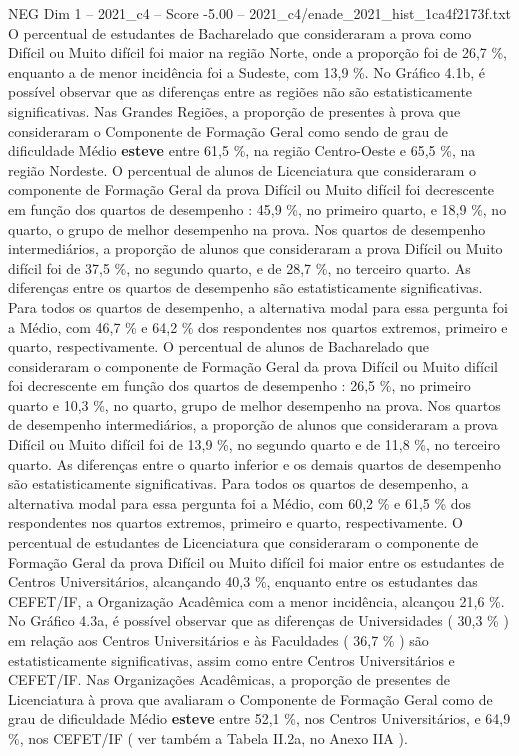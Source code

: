 \begin{textsample}{NEG Dim 1 – 2021\_c4 – Score -5.00 – 2021\_c4/enade\_2021\_hist\_1ca4f2173f.txt}
O percentual de estudantes de Bacharelado que consideraram a prova como Difícil ou Muito difícil foi maior na região Norte, onde a proporção foi de 26,7 \%, enquanto a de menor incidência foi a Sudeste, com 13,9 \%.
No Gráfico 4.1b, é possível observar que as diferenças entre as regiões não são estatisticamente significativas.
Nas Grandes Regiões, a proporção de presentes à prova que consideraram o Componente de Formação Geral como sendo de grau de dificuldade Médio \textbf{esteve} entre 61,5 \%, na região Centro-Oeste e 65,5 \%, na região Nordeste.
O percentual de alunos de Licenciatura que consideraram o componente de Formação Geral da prova Difícil ou Muito difícil foi decrescente em função dos quartos de desempenho : 45,9 \%, no primeiro quarto, e 18,9 \%, no quarto, o grupo de melhor desempenho na prova.
Nos quartos de desempenho intermediários, a proporção de alunos que consideraram a prova Difícil ou Muito difícil foi de 37,5 \%, no segundo quarto, e de 28,7 \%, no terceiro quarto.
As diferenças entre os quartos de desempenho são estatisticamente significativas.
Para todos os quartos de desempenho, a alternativa modal para essa pergunta foi a Médio, com 46,7 \% e 64,2 \% dos respondentes nos quartos extremos, primeiro e quarto, respectivamente.
O percentual de alunos de Bacharelado que consideraram o componente de Formação Geral da prova Difícil ou Muito difícil foi decrescente em função dos quartos de desempenho : 26,5 \%, no primeiro quarto e 10,3 \%, no quarto, grupo de melhor desempenho na prova.
Nos quartos de desempenho intermediários, a proporção de alunos que consideraram a prova Difícil ou Muito difícil foi de 13,9 \%, no segundo quarto e de 11,8 \%, no terceiro quarto.
As diferenças entre o quarto inferior e os demais quartos de desempenho são estatisticamente significativas.
Para todos os quartos de desempenho, a alternativa modal para essa pergunta foi a Médio, com 60,2 \% e 61,5 \% dos respondentes nos quartos extremos, primeiro e quarto, respectivamente.
O percentual de estudantes de Licenciatura que consideraram o componente de Formação Geral da prova Difícil ou Muito difícil foi maior entre os estudantes de Centros Universitários, alcançando 40,3 \%, enquanto entre os estudantes das CEFET/IF, a Organização Acadêmica com a menor incidência, alcançou 21,6 \%.
No Gráfico 4.3a, é possível observar que as diferenças de Universidades ( 30,3 \% ) em relação aos Centros Universitários e às Faculdades ( 36,7 \% ) são estatisticamente significativas, assim como entre Centros Universitários e CEFET/IF.
Nas Organizações Acadêmicas, a proporção de presentes de Licenciatura à prova que avaliaram o Componente de Formação Geral como de grau de dificuldade Médio \textbf{esteve} entre 52,1 \%, nos Centros Universitários, e 64,9 \%, nos CEFET/IF ( ver também a Tabela II.2a, no Anexo IIA ).

\end{textsample}
